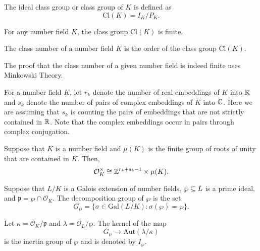 \begin{definition}
    The ideal class group or class group of $K$ is defined as 
        \[\textrm{Cl}(K) = I_K/P_K.\]
\end{definition}

\begin{theorem}
    For any number field $K$, the class group $\textrm{Cl}(K)$ is finite.
\end{theorem}

\begin{definition}
    The class number of a number field $K$ is the order of the class group $\textrm{Cl}(K)$.
\end{definition}

The proof that the class number of a given number field is indeed finite uses Minkowski Theory.

For a number field $K$, let $r_k$ denote the number of real embeddings of $K$ into $\mathbb{R}$ and $s_k$ denote the number of pairs of complex embeddings of $K$ into $\mathbb{C}$. Here we are assuming that $s_k$ is counting the pairs of embeddings that are not strictly contained in $\mathbb{R}$. Note that the complex embeddings occur in pairs through complex conjugation.

\begin{theorem}
    Suppose that $K$ is a number field and $\mu(K)$ is the finite group of roots of unity that are contained in $K$. Then,
        \[\mathcal{O}_{K}^\times \cong \mathbb{Z}^{r_k + s_k -1} \times \mu(K).\]
\end{theorem}

\begin{definition}
    Suppose that $L/K$ is a Galois extension of number fields, $\wp \subseteq L$ is a prime ideal, and $\mathfrak{p} = \wp \cap \mathcal{O}_{K}$. The decomposition group of $\wp$ is the set 
        \[G_\wp = \{\sigma \in \textrm{Gal}(L/K): \sigma(\wp) = \wp\}.\]
\end{definition}


\begin{definition}
    Let $\kappa = \mathcal{O}_{K}/\mathfrak{p}$ and $\lambda = \mathcal{O}_{L}/\wp$. The kernel of the map
        \[G_\wp \to \textrm{Aut}(\lambda/\kappa)\]
    is the inertia group of $\wp$ and is denoted by $I_\wp$. 
\end{definition}

